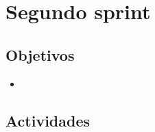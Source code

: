\section{Segundo sprint} %
\label{sec:segundo_sprint}

\subsection{Objetivos}

\begin{itemize}
	\item 
\end{itemize}

\subsection{Actividades} %
\label{sub:actividades}

